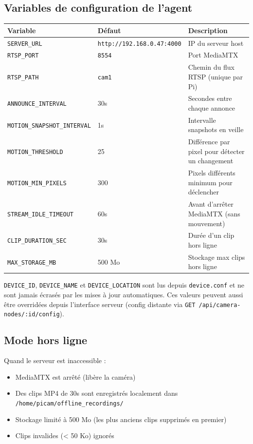 \documentclass[12pt,a4paper]{article}
\begin{document}
\subsection{Variables de configuration de l'agent}

\begin{longtable}{|l|l|p{7cm}|}
\hline
\textbf{Variable} & \textbf{Défaut} & \textbf{Description} \\
\hline
\endhead
\hline
\endfoot
\texttt{SERVER\_URL} & \texttt{http://192.168.0.47:4000} & IP du serveur host \\
\texttt{RTSP\_PORT} & \texttt{8554} & Port MediaMTX \\
\texttt{RTSP\_PATH} & \texttt{cam1} & Chemin du flux RTSP (unique par Pi) \\
\texttt{ANNOUNCE\_INTERVAL} & 30s & Secondes entre chaque annonce \\
\texttt{MOTION\_SNAPSHOT\_INTERVAL} & 1s & Intervalle snapshots en veille \\
\texttt{MOTION\_THRESHOLD} & 25 & Différence par pixel pour détecter un changement \\
\texttt{MOTION\_MIN\_PIXELS} & 300 & Pixels différents minimum pour déclencher \\
\texttt{STREAM\_IDLE\_TIMEOUT} & 60s & Avant d'arrêter MediaMTX (sans mouvement) \\
\texttt{CLIP\_DURATION\_SEC} & 30s & Durée d'un clip hors ligne \\
\texttt{MAX\_STORAGE\_MB} & 500 Mo & Stockage max clips hors ligne \\
\hline
\end{longtable}

\texttt{DEVICE\_ID}, \texttt{DEVICE\_NAME} et \texttt{DEVICE\_LOCATION} sont lus depuis
\texttt{device.conf} et ne sont jamais écrasés par les mises à jour automatiques.
Ces valeurs peuvent aussi être overridées depuis l'interface serveur (config distante via
\texttt{GET /api/camera-nodes/:id/config}).

\subsection{Mode hors ligne}

Quand le serveur est inaccessible :
\begin{itemize}
  \item MediaMTX est arrêté (libère la caméra)
  \item Des clips MP4 de 30s sont enregistrés localement dans
    \texttt{/home/picam/offline\_recordings/}
  \item Stockage limité à 500 Mo (les plus anciens clips supprimés en premier)
  \item Clips invalides (< 50 Ko) ignorés
\end{itemize}
\end{document}
